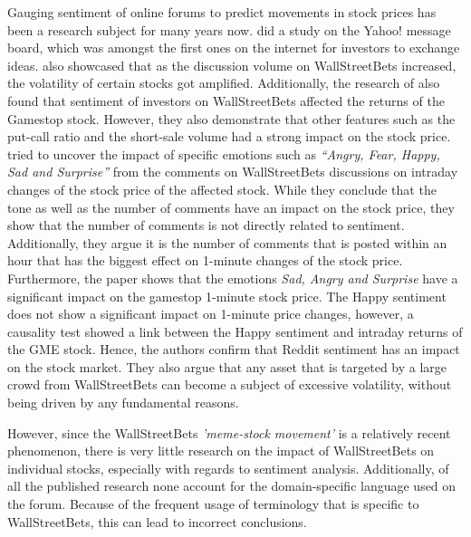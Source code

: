 \documentclass[11pt, a4paper]{article}
\begin{document}
Gauging sentiment of online forums to predict movements in stock prices has been a research subject for many years now. 
\cite{das2007yahoo} did a study on the Yahoo! message board, which was amongst the first ones on the internet for investors to exchange ideas. 
\cite{lyocsa2021yolotrading} also showcased that as the discussion volume on WallStreetBets increased, the volatility of certain stocks got amplified. 
Additionally, the research of \cite{umar2021ataleofcompanyfundamentals} also found that sentiment of investors on WallStreetBets affected the returns of the Gamestop stock. 
However, they also demonstrate that other features such as the put-call ratio and the short-sale volume had a strong impact on the stock price. \\
\cite{long2021LikeTheStock} tried to uncover the impact of specific emotions such as \emph{“Angry, Fear, Happy, Sad and Surprise”} from the comments on 
WallStreetBets discussions on intraday changes of the stock price of the affected stock. While they conclude that the tone as well as the number of 
comments have an impact on the stock price, they show that the number of comments is not directly related to sentiment. Additionally, they argue it 
is the number of comments that is posted within an hour that has the biggest effect on 1-minute changes of the stock price. Furthermore, the paper 
shows that the emotions \emph{Sad, Angry and Surprise} have a significant impact on the gamestop 1-minute stock price. The Happy sentiment does not show a 
significant impact on 1-minute price changes, however, a causality test showed a link between the Happy sentiment and intraday returns of the GME stock. 
Hence, the authors confirm that Reddit 
sentiment has an impact on the stock market. They also argue that any asset that is targeted by a large crowd from WallStreetBets can become a subject 
of excessive volatility, without being driven by any fundamental reasons.

However, since the WallStreetBets \emph{'meme-stock movement'} is a relatively recent phenomenon, there is very little research on the impact of 
WallStreetBets on individual stocks, especially with regards to sentiment analysis. 
Additionally, of all the published research none account 
for the domain-specific language used on the forum. Because of the frequent usage of terminology that is specific to WallStreetBets, 
this can lead to incorrect conclusions.
\end{document}

